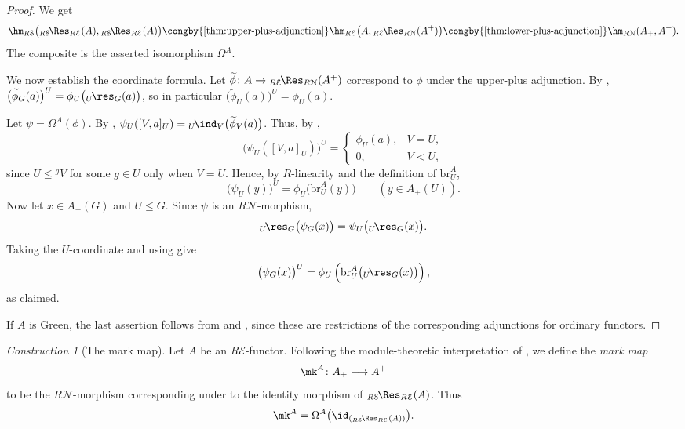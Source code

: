 \documentclass{amsart}
\numberwithin{equation}{section}%
\theoremstyle{remark}
\newtheorem{Cons}[equation]{Construction}
\theoremstyle{definition}
\newcommand{\e}{\mathcal E}
\newcommand{\s}{\mathcal S}
\newcommand{\n}{\mathcal N}
\newcommand{\lind}[1]{{}_{#1}\!\ind}
\newcommand{\lres}[1]{{}_{#1}\!\res}
\newcommand{\iRes}[2]{{}_{#1}\!\Res_{#2}}
\newcommand{\br}{\text{br}}
\begin{document}
\begin{proof}
We get
%
\[
\hm_{R\s}
\bigl(
\iRes{R\s}{R\e}(A),
\iRes{R\s}{R\e}(A)
\bigr)
\congby{\ref{thm:upper-plus-adjunction}}
\hm_{R\e}
\bigl(
A,
\iRes{R\e}{R\n}(A^+)
\bigr)\congby{\ref{thm:lower-plus-adjunction}}\hm_{R\n}(A_+,A^+).
\]
The composite is the asserted isomorphism $\Omega^A$.

We now establish the coordinate formula.
Let
$\widetilde\phi\colon A\to\iRes{R\e}{R\n}(A^+)$
correspond to $\phi$ under the upper-plus adjunction. By
, $\bigl(\widetilde\phi_G(a)\bigr)^U
=
\phi_U\bigl(\lres{U}_G(a)\bigr)$,
so in particular
$\bigl(\widetilde\phi_U(a)\bigr)^U=\phi_U(a)$.

Let $\psi=\Omega^A(\phi)$. By
,
$\psi_U([V,a]_U)
=
\lind{U}_V\bigl(\widetilde\phi_V(a)\bigr)$.
Thus, by ,
%
\[
\bigl(\psi_U([V,a]_U)\bigr)^U
=
\begin{cases}
	\phi_U(a),&V=U,\\
	0,&V<U,
\end{cases}
\]
%
since $U\leq{}^gV$ for some $g\in U$ only when $V=U$.
Hence, by $R$-linearity and the definition of $\br_U^A$,
%
\begin{equation}
	\label{eq:plus-adjunction-top-coordinate}
	\bigl(\psi_U(y)\bigr)^U
	=
	\phi_U\bigl(\br_U^A(y)\bigr)
	\qquad
	(y\in A_+(U)).
\end{equation}
%
Now let $x\in A_+(G)$ and $U\leq G$. Since $\psi$ is an
$R\n$-morphism,
%
\[
\lres{U}_G\bigl(\psi_G(x)\bigr)
=
\psi_U\bigl(\lres{U}_G(x)\bigr).
\]
%
Taking the $U$-coordinate and using
give
%
\[
\bigl(\psi_G(x)\bigr)^U
=
\phi_U\left(
\br_U^A\bigl(\lres{U}_G(x)\bigr)
\right),
\]
%
as claimed.

If $A$ is Green, the last assertion follows from
 and	
, since these are
restrictions of the corresponding adjunctions for
ordinary functors.
\end{proof}
%
\begin{Cons}[The mark map]
\label{con:mark-map}
Let $A$ be an $R\e$-functor.
Following the module-theoretic interpretation of
\cite[Corollary~5.10]{Coskun07}, we define the \emph{mark map}
%
\[
\mk^A\colon A_+\longrightarrow A^+
\]
%
to be the $R\n$-morphism corresponding under
 to the identity
morphism of $\iRes{R\s}{R\e}(A)$.  Thus
%
\[
\mk^A
=
\Omega^A
\bigl(
\id_{(\iRes{R\s}{R\e}(A))}
\bigr).
\]
\end{Cons}
\end{document}
